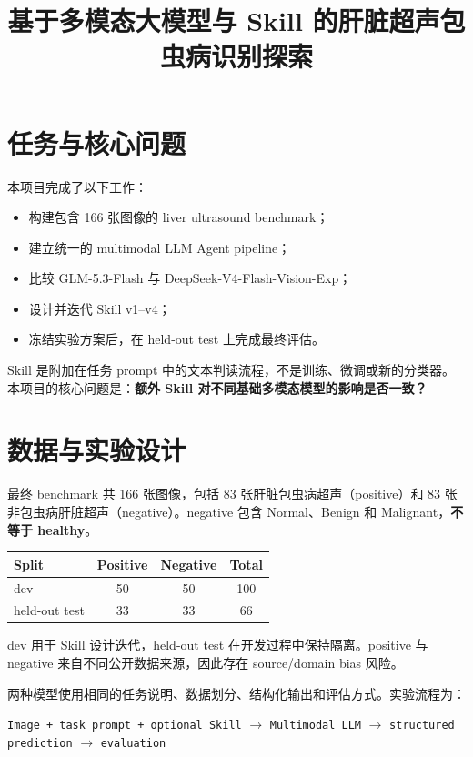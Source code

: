 \documentclass[11pt,a4paper]{ctexart}
\title{基于多模态大模型与 Skill 的肝脏超声包虫病识别探索}
\author{}
\date{}
\begin{document}
\maketitle

\section{任务与核心问题}

本项目完成了以下工作：

\begin{itemize}
    \item 构建包含 166 张图像的 liver ultrasound benchmark；
    \item 建立统一的 multimodal LLM Agent pipeline；
    \item 比较 GLM-5.3-Flash 与 DeepSeek-V4-Flash-Vision-Exp；
    \item 设计并迭代 Skill v1--v4；
    \item 冻结实验方案后，在 held-out test 上完成最终评估。
\end{itemize}

Skill 是附加在任务 prompt 中的文本判读流程，不是训练、微调或新的分类器。本项目的核心问题是：\textbf{额外 Skill 对不同基础多模态模型的影响是否一致？}

\section{数据与实验设计}

最终 benchmark 共 166 张图像，包括 83 张肝脏包虫病超声（positive）和 83 张非包虫病肝脏超声（negative）。negative 包含 Normal、Benign 和 Malignant，\textbf{不等于 healthy}。

\begin{center}
\begin{tabular}{lccc}
\toprule
Split & Positive & Negative & Total \\
\midrule
dev & 50 & 50 & 100 \\
held-out test & 33 & 33 & 66 \\
\bottomrule
\end{tabular}
\end{center}

dev 用于 Skill 设计迭代，held-out test 在开发过程中保持隔离。positive 与 negative 来自不同公开数据来源，因此存在 source/domain bias 风险。

两种模型使用相同的任务说明、数据划分、结构化输出和评估方式。实验流程为：

\begin{center}
\texttt{Image + task prompt + optional Skill}
$\rightarrow$ \texttt{Multimodal LLM}
$\rightarrow$ \texttt{structured prediction}
$\rightarrow$ \texttt{evaluation}
\end{center}
\end{document}
